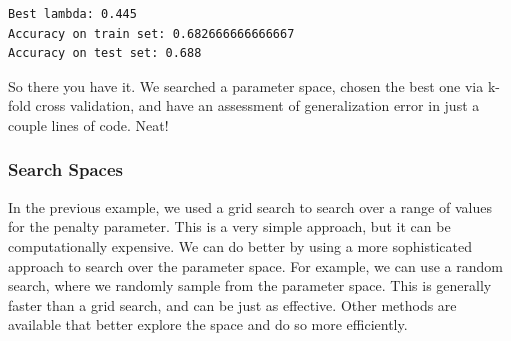 \documentclass[
  letterpaper,
]{krantz}
\newenvironment{Shaded}{}{}
\newcommand{\AttributeTok}[1]{\textcolor[rgb]{0.49,0.56,0.16}{#1}}
\newcommand{\CommentTok}[1]{\textcolor[rgb]{0.38,0.63,0.69}{\textit{#1}}}
\newcommand{\DecValTok}[1]{\textcolor[rgb]{0.25,0.63,0.44}{#1}}
\newcommand{\FloatTok}[1]{\textcolor[rgb]{0.25,0.63,0.44}{#1}}
\newcommand{\FunctionTok}[1]{\textcolor[rgb]{0.02,0.16,0.49}{#1}}
\newcommand{\NormalTok}[1]{#1}
\newcommand{\OtherTok}[1]{\textcolor[rgb]{0.00,0.44,0.13}{#1}}
\newcommand{\SpecialCharTok}[1]{\textcolor[rgb]{0.25,0.44,0.63}{#1}}
\newcommand{\StringTok}[1]{\textcolor[rgb]{0.25,0.44,0.63}{#1}}
\begin{document}
\begin{Shaded}
\end{Shaded}

\hypertarget{tbl-tune-results-r}{}
\begin{verbatim}
Best lambda: 0.445
Accuracy on train set: 0.682666666666667
Accuracy on test set: 0.688
\end{verbatim}

So there you have it. We searched a parameter space, chosen the best one
via k-fold cross validation, and have an assessment of generalization
error in just a couple lines of code. Neat!

\subsubsection{Search Spaces}\label{search-spaces}

In the previous example, we used a grid search to search over a range of
values for the penalty parameter. This is a very simple approach, but it
can be computationally expensive. We can do better by using a more
sophisticated approach to search over the parameter space. For example,
we can use a random search, where we randomly sample from the parameter
space. This is generally faster than a grid search, and can be just as
effective. Other methods are available that better explore the space and
do so more efficiently.
\end{document}
